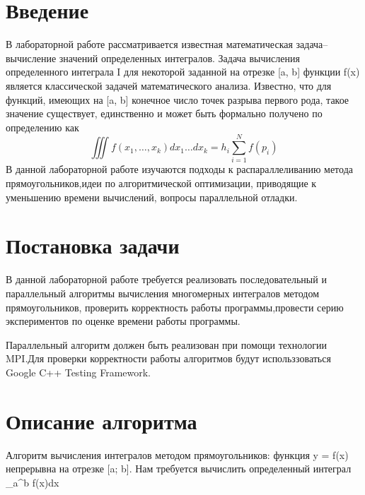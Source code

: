\documentclass{report}
\begin{document}
\setcounter{page}{2}

\tableofcontents
\newpage

\section*{Введение}
\par В лабораторной работе рассматривается известная математическая задача–вычисление значений определенных интегралов.
Задача вычисления определенного интеграла I для некоторой заданной на отрезке [a, b] функции f(x) является классической задачей математического анализа. Известно, что для функций, имеющих на [a, b] конечное число точек разрыва первого рода, такое значение существует, единственно и может быть формально получено по определению как\\
\begin{equation}\iiint{f(x_1,\dots,x_k) dx_1 \dots dx_k} = h_i\sum_{i=1}^{N}{f(p_{i})} \end{equation}
В данной лабораторной работе изучаются подходы к распараллеливанию метода прямоугольников,идеи по алгоритмической оптимизации, приводящие к уменьшению времени вычислений, вопросы параллельной отладки.
\newpage

\section*{Постановка задачи}
\par В данной лабораторной работе требуется реализовать последовательный и параллельный алгоритмы вычисления многомерных интегралов методом прямоугольников, проверить корректность работы программы,провести серию экспериментов по оценке времени работы программы.

\par Параллельный алгоритм должен быть реализован при помощи технологии MPI.Для проверки корректности работы алгоритмов будут использзоваться Google C++ Testing Framework.
\newpage

\section*{Описание алгоритма}
\par {}
Алгоритм вычисления интегралов методом прямоугольников:
 функция y = f(x) непрерывна на отрезке [a; b]. Нам требуется вычислить определенный интеграл _a^b f(x)dx
\end{document}
